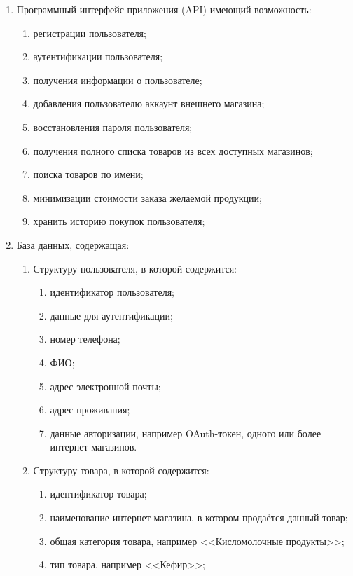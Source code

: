 \documentclass[a4paper,12pt,reqno]{article}
\begin{document}
  \begin{enumerate}
    \item Программный интерфейс приложения (API) имеющий возможность:
    \begin{enumerate}
      \item регистрации пользователя;
      \item аутентификации пользователя; %
      \item получения информации о пользователе;
      \item добавления пользователю аккаунт внешнего магазина; %
      \item восстановления пароля пользователя;
      \item получения полного списка товаров из всех доступных магазинов;
      \item поиска товаров по имени;
      \item минимизации стоимости заказа желаемой продукции;
      \item хранить историю покупок пользователя;
    \end{enumerate}
    \item База данных, содержащая:
    \begin{enumerate}
      \item Структуру пользователя, в которой содержится:
      \begin{enumerate}
        \item идентификатор пользователя;
        \item данные для аутентификации;
        \item номер телефона;
        \item ФИО;
        \item адрес электронной почты;
        \item адрес проживания; %
        \item данные авторизации, например OAuth-токен, одного или более интернет магазинов.
      \end{enumerate}
      \item Структуру товара, в которой содержится:
      \begin{enumerate}
        \item идентификатор товара;
        \item наименование интернет магазина, в котором продаётся данный товар;
        \item общая категория товара, например <<Кисломолочные продукты>>;
        \item тип товара, например <<Кефир>>;

\end{enumerate}
\end{enumerate}
\end{enumerate}
\end{document}
